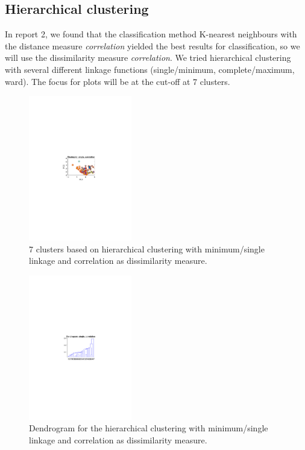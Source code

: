 \subsection{Hierarchical clustering}

In report 2, we found that the classification method K-nearest neighbours with the distance measure \textcolor{Bittersweet}{\textit{correlation}} yielded the best results for classification, so we will use the dissimilarity measure \textcolor{Bittersweet}{\textit{correlation}}. We tried hierarchical clustering with several different linkage functions (single/minimum, complete/maximum, ward). The focus for plots will be at the cut-off at 7 clusters.

\begin{multicols}{2}
\begin{figure}[H]
    \centering
    \includegraphics[width=0.4\textwidth]{fig/cluster_single_cor.pdf}
    \caption{7 clusters based on hierarchical clustering with minimum/single linkage and correlation as dissimilarity measure.}
    \label{fig:cluster_single_cor}
\end{figure}

\begin{figure}[H]
    \centering
    \includegraphics[width=0.4\textwidth]{fig/dendro_single_cor.pdf}
    \caption{Dendrogram for the hierarchical clustering with minimum/single linkage and correlation as dissimilarity measure.}
    \label{fig:dendro_single_cor}
\end{figure}

\end{multicols}


